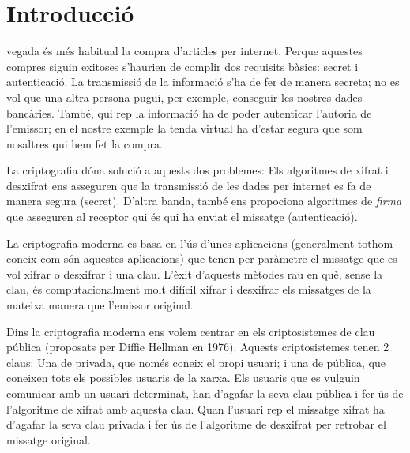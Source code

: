 \documentclass[journal]{IEEEtran}
\begin{document}
\section{Introducció}
% 
% 
% 
% 
 vegada és més habitual la compra d'articles per internet. 
Perque aquestes compres siguin exitoses s'haurien de complir 
dos requisits bàsics: secret i autenticació. La transmissió de la informació s'ha de fer de manera secreta; no es vol que una altra persona pugui, per exemple, conseguir les nostres dades bancàries. També, qui rep la informació ha de poder autenticar l'autoria de l'emissor; en el nostre exemple la tenda virtual ha d'estar segura que som nosaltres qui hem fet la compra.

La criptografia dóna solució a aquests dos problemes: Els algoritmes 
de xifrat i desxifrat ens asseguren que la transmissió de les dades 
per internet es fa de manera segura (secret). D'altra banda, també ens 
propociona algoritmes de \textit{firma} que asseguren al receptor 
qui és qui ha enviat el missatge (autenticació).

La criptografia moderna es basa en l'ús d'unes aplicacions (generalment
 tothom coneix com són aquestes aplicacions) que tenen 
per paràmetre el missatge que es vol xifrar o desxifrar i una clau. 
L'èxit d'aquests mètodes rau en què, sense la clau, és computacionalment molt difícil 
xifrar i desxifrar els missatges de la mateixa manera que l'emissor original.

Dins la criptografia moderna ens volem centrar en els criptosistemes de 
clau pública (proposats per Diffie Hellman en 1976). Aquests criptosistemes 
tenen 2 claus: Una de privada, que només 
coneix el propi usuari; i una de pública, que coneixen tots els possibles usuaris 
de la xarxa. Els usuaris que es vulguin 
comunicar amb un usuari determinat, han d'agafar la seva clau pública i fer ús 
de l'algoritme de xifrat amb aquesta clau. Quan l'usuari rep el missatge xifrat 
ha d'agafar la seva clau privada i fer ús de l'algoritme de desxifrat per retrobar el missatge original.
\end{document}
